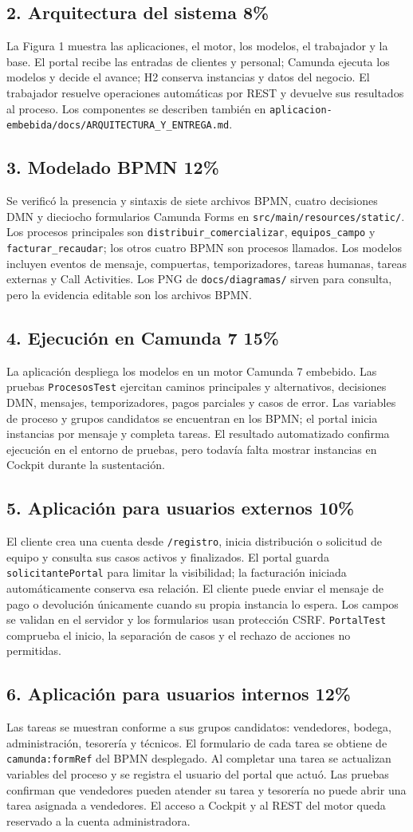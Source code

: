 \documentclass[11pt,letterpaper]{article}
\newcommand{\ruta}[1]{\nolinkurl{#1}}
\newcommand{\criterio}[3]{\needspace{8\baselineskip}\subsection*{#1. #2 \hfill\normalsize\color{gris}#3}}
\begin{document}
\criterio{2}{Arquitectura del sistema}{8\%}
La Figura 1 muestra las aplicaciones, el motor, los modelos, el trabajador y la base. El portal recibe las entradas de clientes y personal; Camunda ejecuta los modelos y decide el avance; H2 conserva instancias y datos del negocio. El trabajador resuelve operaciones automáticas por REST y devuelve sus resultados al proceso. Los componentes se describen también en \ruta{aplicacion-embebida/docs/ARQUITECTURA_Y_ENTREGA.md}.

\criterio{3}{Modelado BPMN}{12\%}
Se verificó la presencia y sintaxis de siete archivos BPMN, cuatro decisiones DMN y dieciocho formularios Camunda Forms en \ruta{src/main/resources/static/}. Los procesos principales son \ruta{distribuir_comercializar}, \ruta{equipos_campo} y \ruta{facturar_recaudar}; los otros cuatro BPMN son procesos llamados. Los modelos incluyen eventos de mensaje, compuertas, temporizadores, tareas humanas, tareas externas y Call Activities. Los PNG de \ruta{docs/diagramas/} sirven para consulta, pero la evidencia editable son los archivos BPMN.

\criterio{4}{Ejecución en Camunda 7}{15\%}
La aplicación despliega los modelos en un motor Camunda 7 embebido. Las pruebas \ruta{ProcesosTest} ejercitan caminos principales y alternativos, decisiones DMN, mensajes, temporizadores, pagos parciales y casos de error. Las variables de proceso y grupos candidatos se encuentran en los BPMN; el portal inicia instancias por mensaje y completa tareas. El resultado automatizado confirma ejecución en el entorno de pruebas, pero todavía falta mostrar instancias en Cockpit durante la sustentación.

\criterio{5}{Aplicación para usuarios externos}{10\%}
El cliente crea una cuenta desde \ruta{/registro}, inicia distribución o solicitud de equipo y consulta sus casos activos y finalizados. El portal guarda \ruta{solicitantePortal} para limitar la visibilidad; la facturación iniciada automáticamente conserva esa relación. El cliente puede enviar el mensaje de pago o devolución únicamente cuando su propia instancia lo espera. Los campos se validan en el servidor y los formularios usan protección CSRF. \ruta{PortalTest} comprueba el inicio, la separación de casos y el rechazo de acciones no permitidas.

\criterio{6}{Aplicación para usuarios internos}{12\%}
Las tareas se muestran conforme a sus grupos candidatos: vendedores, bodega, administración, tesorería y técnicos. El formulario de cada tarea se obtiene de \ruta{camunda:formRef} del BPMN desplegado. Al completar una tarea se actualizan variables del proceso y se registra el usuario del portal que actuó. Las pruebas confirman que vendedores pueden atender su tarea y tesorería no puede abrir una tarea asignada a vendedores. El acceso a Cockpit y al REST del motor queda reservado a la cuenta administradora.
\end{document}
